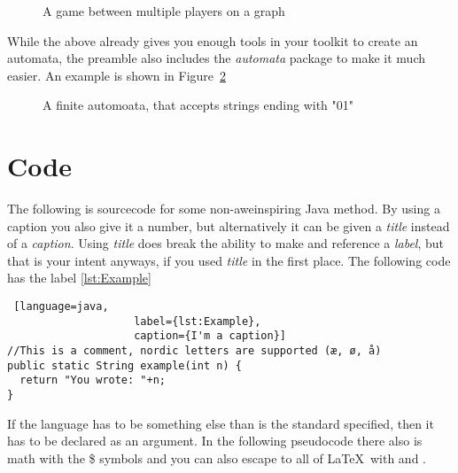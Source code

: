 \documentclass[a4, english]{article}
\begin{document}
\begin{figure}[ht!]
  \centering
  
  \caption{A game between multiple players on a graph}
  \label{fig:game}
\end{figure}

While the above already gives you enough tools in your toolkit to create an
automata, the preamble also includes the \emph{automata} package to make it much
easier. An example is shown in Figure~\ref{fig:FA}
\begin{figure}[ht!]
  \centering
  \caption{A finite automoata, that accepts strings ending with "01"}
  \label{fig:FA}
\end{figure}

\section{Code}
The following is sourcecode for some non-aweinspiring Java method. By using a
caption you also give it a number, but alternatively it can be given a
\emph{title} instead of a \emph{caption}. Using \emph{title} does break the
ability to make and reference a \emph{label}, but that is your intent anyways,
if you used \emph{title} in the first place. The following code has the label
\ref{lst:Example}

\begin{lstlisting} [language=java,
                    label={lst:Example},
                    caption={I'm a caption}]
//This is a comment, nordic letters are supported (æ, ø, å)
public static String example(int n) {
  return "You wrote: "+n;
}
\end{lstlisting}

If the language has to be something else than is the standard specified, then it
has to be declared as an argument. In the following pseudocode there also is
math with the \$ symbols and you can also escape to all of \LaTeX\ with
 and .
\end{document}
